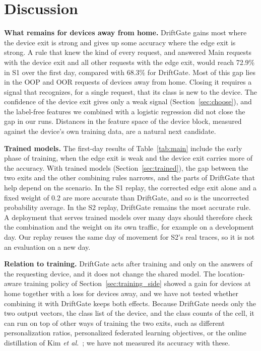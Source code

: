 \section{Discussion}
\label{sec:discussion}

\textbf{What remains for devices away from home.} DriftGate gains most where the device exit is strong and gives up some accuracy where the edge exit is strong. A rule that knew the kind of every request, and answered Main requests with the device exit and all other requests with the edge exit, would reach 72.9\% in S1 over the first day, compared with 68.3\% for DriftGate. Most of this gap lies in the OOP and OOR requests of devices away from home. Closing it requires a signal that recognizes, for a single request, that its class is new to the device. The confidence of the device exit gives only a weak signal (Section~\ref{sec:choose}), and the label-free features we combined with a logistic regression did not close the gap in our runs. Distances in the feature space of the device block, measured against the device's own training data, are a natural next candidate.

\textbf{Trained models.} The first-day results of Table~\ref{tab:main} include the early phase of training, when the edge exit is weak and the device exit carries more of the accuracy. With trained models (Section~\ref{sec:trained}), the gap between the two exits and the other combining rules narrows, and the parts of DriftGate that help depend on the scenario. In the S1 replay, the corrected edge exit alone and a fixed weight of 0.2 are more accurate than DriftGate, and so is the uncorrected probability average. In the S2 replay, DriftGate remains the most accurate rule. A deployment that serves trained models over many days should therefore check the combination and the weight on its own traffic, for example on a development day. Our replay reuses the same day of movement for S2's real traces, so it is not an evaluation on a new day.

\textbf{Relation to training.} DriftGate acts after training and only on the answers of the requesting device, and it does not change the shared model. The location-aware training policy of Section~\ref{sec:training_side} showed a gain for devices at home together with a loss for devices away, and we have not tested whether combining it with DriftGate keeps both effects. Because DriftGate needs only the two output vectors, the class list of the device, and the class counts of the cell, it can run on top of other ways of training the two exits, such as different personalization ratios, personalized federated learning objectives, or the online distillation of Kim \emph{et al.}~\cite{kim2025onlinepsfl}; we have not measured its accuracy with these.


